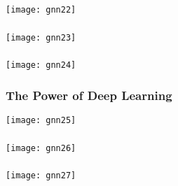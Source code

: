 \begin{frame}[fragile]\frametitle{}

\begin{center}
\texttt{[image: gnn22]}
\end{center}	  

\end{frame}

\begin{frame}[fragile]\frametitle{}

\begin{center}
\texttt{[image: gnn23]}
\end{center}	  

\end{frame}

\begin{frame}[fragile]\frametitle{}

\begin{center}
\texttt{[image: gnn24]}
\end{center}	  

\end{frame}

\begin{frame}[fragile]\frametitle{The Power of Deep Learning}

\begin{center}
\texttt{[image: gnn25]}
\end{center}	  

\end{frame}

\begin{frame}[fragile]\frametitle{}

\begin{center}
\texttt{[image: gnn26]}
\end{center}	  

\end{frame}

\begin{frame}[fragile]\frametitle{}

\begin{center}
\texttt{[image: gnn27]}
\end{center}	  

\end{frame}

